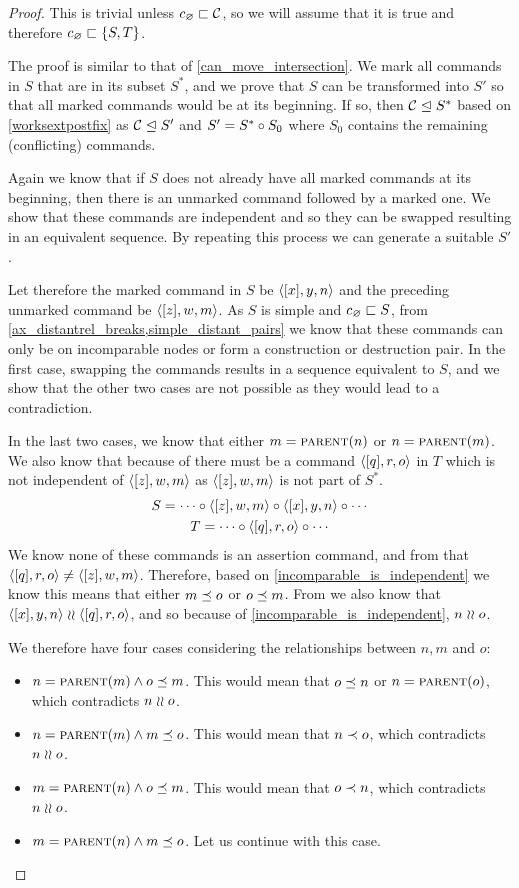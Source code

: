 \begin{proof}
This is trivial unless $c_\varnothing\sqsubset{\mathcal{C}}$, so we will assume that it is true
and therefore $c_\varnothing\sqsubset{\{{S,T}\}}$.

The proof is similar to that of \cref{can_move_intersection}.
We mark all commands in $S$ that are in its subset $S^*$, and
we prove that $S$ can be transformed into $S'$
so that all marked commands would be at its beginning.
If so, then 
${\mathcal{C}}\trianglelefteq{S^*}$ 
based on \cref{worksextpostfix}
as ${\mathcal{C}}\trianglelefteq{S'}$ and $S'=S^*\circ S_0$ 
where $S_0$ contains the remaining (conflicting) commands.

Again we know that if $S$ does not already have all marked commands at its beginning,
then there is an unmarked command followed by a marked one.
We show that these commands are independent and so they can be swapped
resulting in an equivalent sequence.
By repeating this process we can generate a suitable $S'$.

Let therefore the marked command in $S$ be $\langle{[x],y,n}\rangle$
and the preceding unmarked command be $\langle{[z],w,m}\rangle$.
As $S$ is simple and $c_\varnothing\sqsubset{S}$, from 
\cref{ax_distantrel_breaks,simple_distant_pairs}
we know that these commands can only be on incomparable nodes or form a construction or destruction pair.
In the first case, swapping the commands results in a sequence equivalent to $S$,
and we show that the other two cases are not possible as they would lead to a contradiction.

In the last two cases, we know that either $m=\text{\normalfont\scshape{parent}}(n)$ or $n=\text{\normalfont\scshape{parent}}(m)$.
We also know that because of {\condApr} there must be 
a command $\langle{[q],r,o}\rangle$ in $T$ which is not independent of $\langle{[z],w,m}\rangle$
as $\langle{[z],w,m}\rangle$ is not part of $S^*$.
\begin{gather*}
S = \cdots\circ  \langle{[z],w,m}\rangle\circ  \langle{[x],y,n}\rangle\circ  \cdots \\
T = \cdots\circ  \langle{[q],r,o}\rangle\circ \cdots
\end{gather*}
We know none of these commands is an assertion command, and 
from {\condDisj} that $\langle{[q],r,o}\rangle\neq\langle{[z],w,m}\rangle$.
Therefore, based on \cref{incomparable_is_independent} we know this means that
either $m\preceq o$ or $o\preceq m$.
From {\condApr} we also know that $\langle{[x],y,n}\rangle\mathrel{\wr\wr} \langle{[q],r,o}\rangle$,
and so because of \cref{incomparable_is_independent},
$n\mathrel{\wr\wr} o$.

We therefore have four cases considering the relationships between $n,m$ and $o$:
\begin{itemize}
\item $n=\text{\normalfont\scshape{parent}}(m) \wedge o\preceq m$.
   This would mean that $o\preceq n$ or $n=\text{\normalfont\scshape{parent}}(o)$, which contradicts $n\mathrel{\wr\wr} o$.
\item $n=\text{\normalfont\scshape{parent}}(m) \wedge m\preceq o$.
   This would mean that $n\prec o$, which contradicts $n\mathrel{\wr\wr} o$.
\item $m=\text{\normalfont\scshape{parent}}(n) \wedge o\preceq m$.
   This would mean that $o\prec n$, which contradicts $n\mathrel{\wr\wr} o$.
\item $m=\text{\normalfont\scshape{parent}}(n) \wedge m\preceq o$.
   Let us continue with this case.
\end{itemize}


\end{proof}
